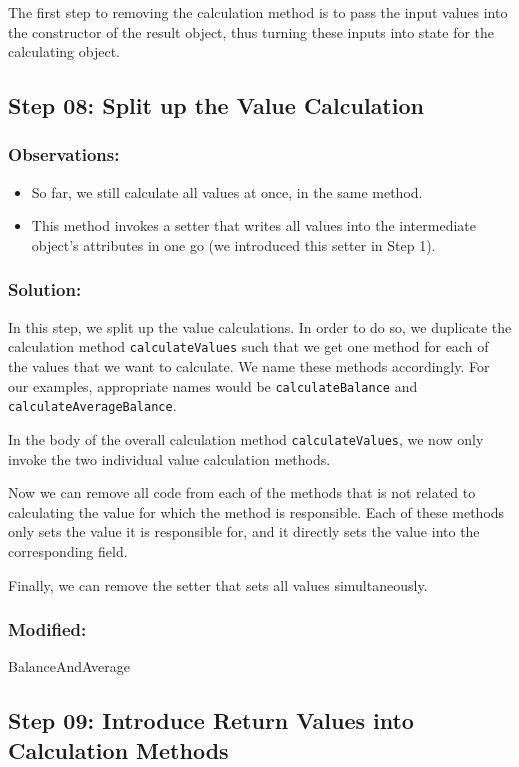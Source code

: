 \documentclass[a4paper,fleqn,titlepage,11pt]{article}
\begin{document}
The first step to removing the calculation method is to pass the input values into the constructor of the result object, thus turning these inputs into state for the calculating object.

\subsection*{Step 08: Split up the Value Calculation}

\subsubsection*{Observations:}
\begin{itemize}
\item So far, we still calculate all values at once, in the same method. 
\item This method invokes a setter that writes all values into the intermediate object's attributes in one go (we introduced this setter in Step 1).
\end{itemize}

\subsubsection*{Solution:}
In this step, we split up the value calculations. In order to do so, we duplicate the calculation method \texttt{calculateValues} such that we get one method for each of the values that we want to calculate. We name these methods accordingly. For our examples, appropriate names would be \texttt{calculateBalance} and \texttt{calculateAverageBalance}.

In the body of the overall calculation method \texttt{calculateValues}, we now only invoke the two individual value calculation methods.

Now we can remove all code from each of the methods that is not related to calculating the value for which the method is responsible. Each of these methods only sets the value it is responsible for, and it directly sets the value into the corresponding field.

Finally, we can remove the setter that sets all values simultaneously.

\subsubsection*{Modified:}

BalanceAndAverage

\subsection*{Step 09: Introduce Return Values into Calculation Methods}
\end{document}
